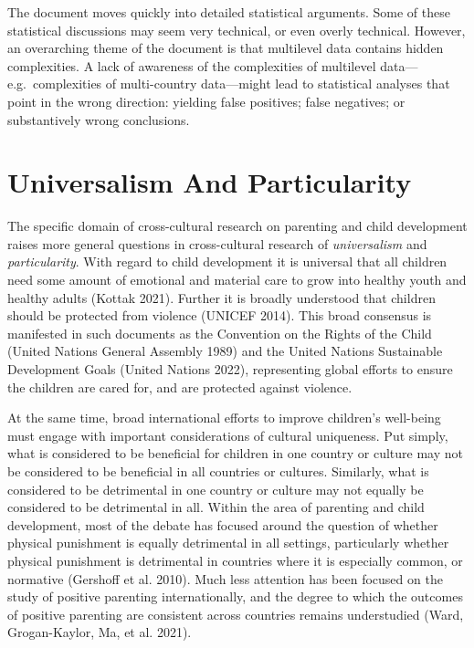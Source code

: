 \documentclass[
  letterpaper,
  DIV=11,
  numbers=noendperiod]{scrreprt}
\begin{document}
The document moves quickly into detailed statistical arguments. Some of
these statistical discussions may seem very technical, or even overly
technical. However, an overarching theme of the document is that
multilevel data contains hidden complexities. A lack of awareness of the
complexities of multilevel data---e.g.~complexities of multi-country
data---might lead to statistical analyses that point in the wrong
direction: yielding false positives; false negatives; or substantively
wrong conclusions.

\hypertarget{universalism-and-particularity}{%
\section{Universalism And
Particularity}\label{universalism-and-particularity}}

The specific domain of cross-cultural research on parenting and child
development raises more general questions in cross-cultural research of
\emph{universalism} and \emph{particularity}. With regard to child
development it is universal that all children need some amount of
emotional and material care to grow into healthy youth and healthy
adults (Kottak 2021). Further it is broadly understood that children
should be protected from violence (UNICEF 2014). This broad consensus is
manifested in such documents as the Convention on the Rights of the
Child (United Nations General Assembly 1989) and the United Nations
Sustainable Development Goals (United Nations 2022), representing global
efforts to ensure the children are cared for, and are protected against
violence.

At the same time, broad international efforts to improve children's
well-being must engage with important considerations of cultural
uniqueness. Put simply, what is considered to be beneficial for children
in one country or culture may not be considered to be beneficial in all
countries or cultures. Similarly, what is considered to be detrimental
in one country or culture may not equally be considered to be
detrimental in all. Within the area of parenting and child development,
most of the debate has focused around the question of whether physical
punishment is equally detrimental in all settings, particularly whether
physical punishment is detrimental in countries where it is especially
common, or normative (Gershoff et al. 2010). Much less attention has
been focused on the study of positive parenting internationally, and the
degree to which the outcomes of positive parenting are consistent across
countries remains understudied (Ward, Grogan-Kaylor, Ma, et al. 2021).
\end{document}
